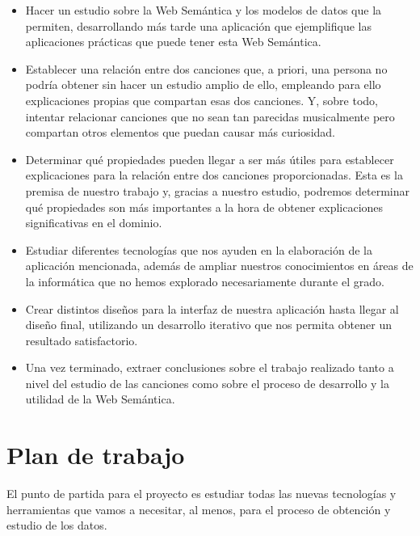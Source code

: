 \begin{itemize}
\item Hacer un estudio sobre la Web Semántica y los modelos de datos que la permiten, desarrollando más tarde una aplicación que ejemplifique las aplicaciones prácticas que puede tener esta Web Semántica.\\

\item Establecer una relación entre dos canciones que, a priori, una persona no podría obtener sin hacer un estudio amplio de ello, empleando para ello explicaciones propias que compartan esas dos canciones. Y, sobre todo, intentar relacionar canciones que no sean tan parecidas musicalmente pero compartan otros elementos que puedan causar más curiosidad.\\

\item Determinar qué propiedades pueden llegar a ser más útiles para establecer explicaciones para la relación entre dos canciones proporcionadas. Esta es la premisa de nuestro trabajo y, gracias a nuestro estudio, podremos determinar qué propiedades son más importantes a la hora de obtener explicaciones significativas en el dominio.\\

\item Estudiar diferentes tecnologías que nos ayuden en la elaboración de la aplicación mencionada, además de ampliar nuestros conocimientos en áreas de la informática que no hemos explorado necesariamente durante el grado.\\

\item Crear distintos diseños para la interfaz de nuestra aplicación hasta llegar al diseño final, utilizando un desarrollo iterativo que nos permita obtener un resultado satisfactorio.\\

\item Una vez terminado, extraer conclusiones sobre el trabajo realizado tanto a nivel del estudio de las canciones como sobre el proceso de desarrollo y la utilidad de la Web Semántica.\\
\end{itemize}


\section{Plan de trabajo}

El punto de partida para el proyecto es estudiar todas las nuevas tecnologías y herramientas que vamos a necesitar, al menos, para el proceso de obtención y estudio de los datos.\\

